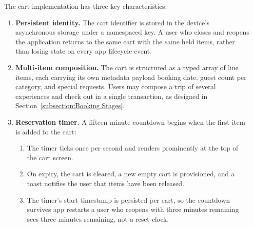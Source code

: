 The cart implementation has three key characteristics:
\begin{enumerate}
  \item \textbf{Persistent identity.} The cart identifier is stored in the device's asynchronous storage under a namespaced key. A user who closes and reopens the application returns to the same cart with the same held items, rather than losing state on every app lifecycle event.
  \item \textbf{Multi-item composition.} The cart is structured as a typed array of line items, each carrying its own metadata payload booking date, guest count per category, and special requests. Users may compose a trip of several experiences and check out in a single transaction, as designed in Section~\ref{subsection:Booking Stages}.
  \item \textbf{Reservation timer.} A fifteen-minute countdown begins when the first item is added to the cart:
  \begin{enumerate}
    \item The timer ticks once per second and renders prominently at the top of the cart screen.
    \item On expiry, the cart is cleared, a new empty cart is provisioned, and a toast notifies the user that items have been released.
    \item The timer's start timestamp is persisted per cart, so the countdown survives app restarts a user who reopens with three minutes remaining sees three minutes remaining, not a reset clock.
  \end{enumerate}
\end{enumerate}


